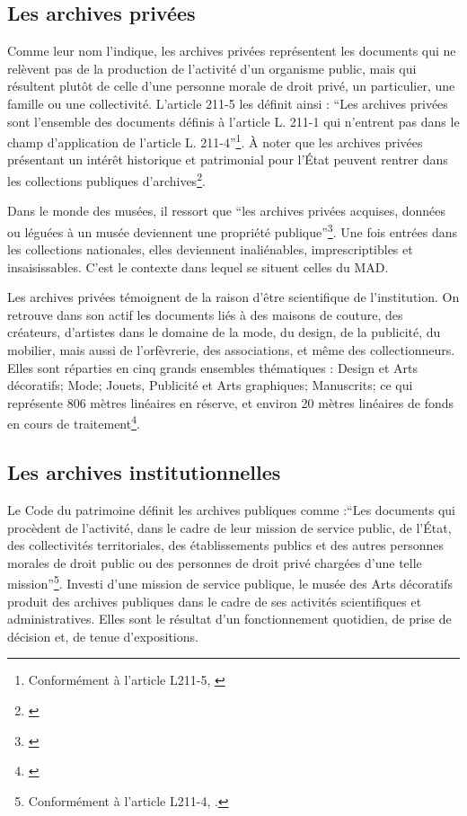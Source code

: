\subsection*{Les archives privées}

Comme leur nom l’indique, les archives privées représentent les documents qui ne relèvent pas de la production de l’activité d’un organisme public, mais qui résultent plutôt de celle d’une personne morale de droit privé, un particulier, une famille ou une collectivité. L’article 211-5 les définit ainsi : \enquote{Les archives privées sont l'ensemble des documents définis à l'article L. 211-1 qui n'entrent pas dans le champ d'application de l'article L. 211-4}\footnote{Conformément à l'article L211-5, \cite{code-patrimoine-legislative}}. À noter que les archives privées présentant un intérêt historique et patrimonial pour l’État peuvent rentrer dans les collections publiques d’archives\footnote{\cite{francearchives-archives-privees}}.

Dans le monde des musées, il ressort que \enquote{les archives privées acquises, données ou léguées à un musée deviennent une propriété publique}\footnote{\cite{archives-en-musees-vademecum}}. Une fois entrées dans les collections nationales, elles deviennent inaliénables, imprescriptibles et insaisissables. C’est le contexte dans lequel se situent celles du MAD.

Les archives privées témoignent de la raison d’être scientifique de l’institution. On retrouve dans son actif les documents liés à des maisons de couture, des créateurs, d’artistes dans le domaine de la mode, du design, de la publicité, du mobilier, mais aussi de l’orfèvrerie, des associations, et même des collectionneurs. Elles sont réparties en cinq grands ensembles thématiques : Design et Arts décoratifs; Mode; Jouets, Publicité et Arts graphiques; Manuscrits; ce qui représente 806 mètres linéaires en réserve, et environ 20 mètres linéaires de fonds en cours de traitement\footnote{\cite{dion-archives-privees-2026}}.

\subsection*{Les archives institutionnelles}

Le Code du patrimoine définit les archives publiques comme :\enquote{Les documents qui procèdent de l’activité, dans le cadre de leur mission de service public, de l’État, des collectivités territoriales, des établissements publics et des autres personnes morales de droit public ou des personnes de droit privé chargées d’une telle mission}\footnote{Conformément à l'article L211-4, \cite{code-patrimoine-legislative} .}. Investi d’une mission de service publique, le musée des Arts décoratifs produit des archives publiques dans le cadre de ses activités scientifiques et administratives. Elles sont le résultat d’un fonctionnement quotidien, de prise de décision et, de tenue d'expositions.


